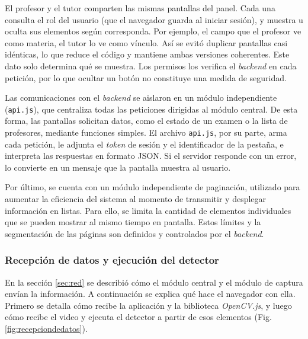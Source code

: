 El profesor y el tutor comparten las mismas pantallas del panel. Cada una consulta el rol del usuario (que el navegador guarda al iniciar sesión), y muestra u oculta sus elementos según corresponda. Por ejemplo, el campo que el profesor ve como materia, el tutor lo ve como vínculo. Así se evitó duplicar pantallas casi idénticas, lo que reduce el código y mantiene ambas versiones coherentes. Este dato solo determina qué se muestra. Los permisos los verifica el \emph{backend} en cada petición, por lo que ocultar un botón no constituye una medida de seguridad.


Las comunicaciones con el \emph{backend} se aislaron en un módulo independiente (\texttt{api.js}), que centraliza todas las peticiones dirigidas al módulo central. De esta forma, las pantallas solicitan datos, como el estado de un examen o la lista de profesores, mediante funciones simples. El archivo \texttt{api.js}, por su parte, arma cada petición, le adjunta el \emph{token} de sesión y el identificador de la pestaña, e interpreta las respuestas en formato JSON. Si el servidor responde con un error, lo convierte en un mensaje que la pantalla muestra al usuario.

Por último, se cuenta con un módulo independiente de paginación, utilizado para aumentar la eficiencia del sistema al momento de transmitir y desplegar información en listas. Para ello, se limita la cantidad de elementos individuales que se pueden mostrar al mismo tiempo en pantalla. Estos límites y la segmentación de las páginas son definidos y controlados por el \emph{backend}.

\subsubsection{Recepción de datos y ejecución del detector}

En la sección \ref{sec:red} se describió cómo el módulo central y el módulo de captura envían la información. A continuación se explica qué hace el navegador con ella. Primero se detalla cómo recibe la aplicación y la biblioteca \emph{OpenCV.js}, y luego cómo recibe el video y ejecuta el detector a partir de esos elementos (Fig. \ref{fig:recepciondedatos}).

